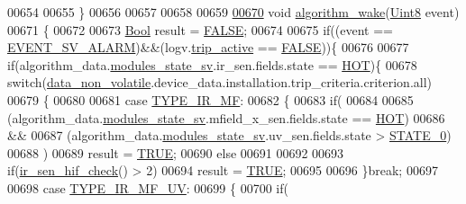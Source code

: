 \begin{DoxyCode}
{{{{{00654 
00655 \}
00656 
00657 
00658 
00659 
\hypertarget{a00038_source_l00670}{}\hyperlink{a00038_a42ed16c7ef20e0c0031fe7ba7ae377b3}{00670} \textcolor{keywordtype}{void} \hyperlink{a00038_a42ed16c7ef20e0c0031fe7ba7ae377b3}{algorithm\_wake}(\hyperlink{a00072_af84840501dec18061d18a68c162a8fa2}{Uint8} event)
00671 \{
00672 
00673     \hyperlink{a00072_a253b248072cfc8bd812c69acd0046eed}{Bool} result = \hyperlink{a00040_aa93f0eb578d23995850d61f7d61c55c1}{FALSE};
00674 
00675     \textcolor{keywordflow}{if}((event == \hyperlink{a00021_a0cec8cae6d70499e62b4251e5843497d}{EVENT\_SV\_ALARM})&&(logv.\hyperlink{a00021_a32ebd32977bc9831cd68530b2b7ec664}{trip\_active} == 
      \hyperlink{a00040_aa93f0eb578d23995850d61f7d61c55c1}{FALSE}))\{
00676 
00677         \textcolor{keywordflow}{if}(algorithm\_data.\hyperlink{a00016_a293140e240bbd54f7601adbc9194148c}{modules\_state\_sv}.ir\_sen.fields.state == 
      \hyperlink{a00021_a1eb14cc432874ddacd1934791dbe12a3}{HOT})\{
00678         \textcolor{keywordflow}{switch}(\hyperlink{a00060_a76ac5f917f5308dcd83de0d7c94559fb}{data\_non\_volatile}.device\_data.installation.trip\_criteria.criterion.all)
00679         \{
00680 
00681                  \textcolor{keywordflow}{case}  \hyperlink{a00016_a78bbb321092eab3b988cf0c89bf0a572}{TYPE\_IR\_MF}:
00682                 \{
00683                       \textcolor{keywordflow}{if}(
00684                           
00685                            (algorithm\_data.\hyperlink{a00016_a293140e240bbd54f7601adbc9194148c}{modules\_state\_sv}.mfield\_x\_sen.fields.state == 
      \hyperlink{a00021_a1eb14cc432874ddacd1934791dbe12a3}{HOT})                         
00686                             &&
00687                            (algorithm\_data.\hyperlink{a00016_a293140e240bbd54f7601adbc9194148c}{modules\_state\_sv}.uv\_sen.fields.state > 
      \hyperlink{a00021_ad6739dbbe5581cac99b7dc8a5e09949c}{STATE\_0})
00688                            )
00689                                 result = \hyperlink{a00040_aa8cecfc5c5c054d2875c03e77b7be15d}{TRUE};
00690                        \textcolor{keywordflow}{else}
00691 
00692 
00693                        \textcolor{keywordflow}{if}(\hyperlink{a00017_a86870a0e00601a92277e689447739ce9}{ir\_sen\_hif\_check}() > 2)
00694                         result = \hyperlink{a00040_aa8cecfc5c5c054d2875c03e77b7be15d}{TRUE};
00695 
00696                 \}\textcolor{keywordflow}{break};
00697 
00698                  \textcolor{keywordflow}{case}  \hyperlink{a00016_a88096870f430e03f71e1f390c67f09ce}{TYPE\_IR\_MF\_UV}:
00699                 \{
00700                    \textcolor{keywordflow}{if}(
}}}}}
\end{DoxyCode}
